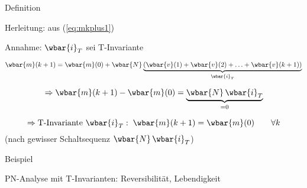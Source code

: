 Definition 

Herleitung: aus (\ref{eq:mkplus1})

Annahme: $\wbar{i}_T$ sei T-Invariante

\begin{equation}
	\wbar{m}(k+1) = \wbar{m}(0) + \wbar{N} \underbrace{\left( \wbar{v}(1) + \wbar{v}(2) + \ldots + \wbar{v}(k+1) \right)}_{\wbar{i}_T}
\end{equation}

\begin{equation}
	\Rightarrow \wbar{m}(k+1) - \wbar{m}(0) = \underbrace{\wbar{N} \, \wbar{i}_T}_{=0}
\end{equation}

\begin{equation}
	\Rightarrow \text{T-Invariante } \wbar{i}_T:\; \wbar{m}(k+1) = \wbar{m}(0) \qquad \forall k
\end{equation}
(nach gewisser Schaltsequenz $\wbar{N} \, \wbar{i}_T$)

Beispiel 

PN-Analyse mit T-Invarianten: Reversibilität, Lebendigkeit 




